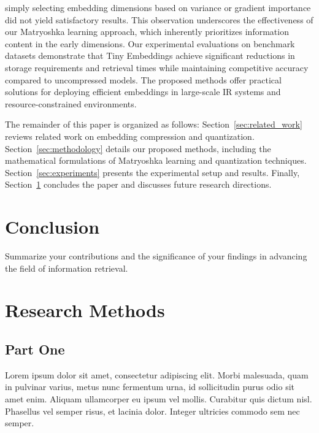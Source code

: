 \documentclass[acmtog, authorversion]{acmart}
\begin{document}
simply selecting embedding dimensions based on variance or gradient importance did not yield satisfactory results. This observation underscores the effectiveness of our Matryoshka learning approach, which inherently prioritizes information content in the early dimensions.  
Our experimental evaluations on benchmark datasets demonstrate that Tiny Embeddings achieve significant reductions in storage requirements and retrieval times while maintaining competitive accuracy compared to uncompressed models. The proposed methods offer practical solutions for deploying efficient embeddings in large-scale IR systems and resource-constrained environments.  
  
The remainder of this paper is organized as follows: Section~\ref{sec:related_work} reviews related work on embedding compression and quantization. Section~\ref{sec:methodology} details our proposed methods, including the mathematical formulations of Matryoshka learning and quantization techniques. Section~\ref{sec:experiments} presents the experimental setup and results. Finally, Section~\ref{sec:conclusion} concludes the paper and discusses future research directions.  
  

  
  





\section{Conclusion}  
\label{sec:conclusion}  
Summarize your contributions and the significance of your findings in advancing the field of information retrieval.  





\appendix

\section{Research Methods}

\subsection{Part One}

Lorem ipsum dolor sit amet, consectetur adipiscing elit. Morbi
malesuada, quam in pulvinar varius, metus nunc fermentum urna, id
sollicitudin purus odio sit amet enim. Aliquam ullamcorper eu ipsum
vel mollis. Curabitur quis dictum nisl. Phasellus vel semper risus, et
lacinia dolor. Integer ultricies commodo sem nec semper.
\end{document}

